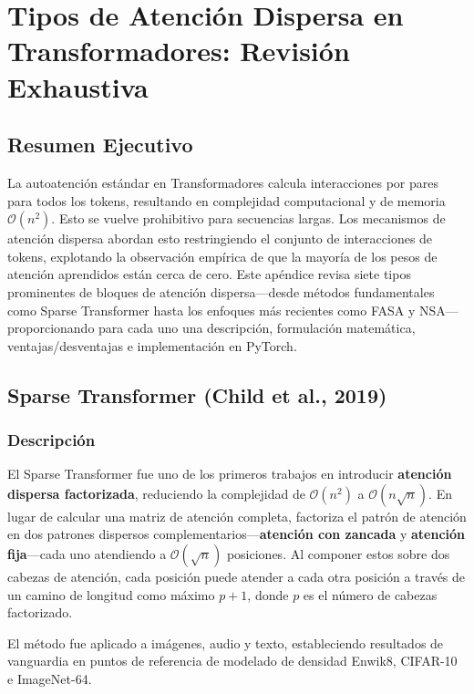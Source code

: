 \documentclass[11pt,a4paper]{article}
\begin{document}
\appendix

\section{Tipos de Atención Dispersa en Transformadores: Revisión Exhaustiva}
\label{appendix:sparse_attention}

\subsection{Resumen Ejecutivo}

La autoatención estándar en Transformadores calcula interacciones por pares para todos los tokens, resultando en complejidad computacional y de memoria $\mathcal{O}(n^2)$. Esto se vuelve prohibitivo para secuencias largas. Los mecanismos de atención dispersa abordan esto restringiendo el conjunto de interacciones de tokens, explotando la observación empírica de que la mayoría de los pesos de atención aprendidos están cerca de cero. Este apéndice revisa siete tipos prominentes de bloques de atención dispersa—desde métodos fundamentales como Sparse Transformer hasta los enfoques más recientes como FASA y NSA—proporcionando para cada uno una descripción, formulación matemática, ventajas/desventajas e implementación en PyTorch.

\subsection{Sparse Transformer (Child et al., 2019)}

\subsubsection{Descripción}

El Sparse Transformer fue uno de los primeros trabajos en introducir \textbf{atención dispersa factorizada}, reduciendo la complejidad de $\mathcal{O}(n^2)$ a $\mathcal{O}(n\sqrt{n})$. En lugar de calcular una matriz de atención completa, factoriza el patrón de atención en dos patrones dispersos complementarios—\textbf{atención con zancada} y \textbf{atención fija}—cada uno atendiendo a $\mathcal{O}(\sqrt{n})$ posiciones. Al componer estos sobre dos cabezas de atención, cada posición puede atender a cada otra posición a través de un camino de longitud como máximo $p+1$, donde $p$ es el número de cabezas factorizado.

El método fue aplicado a imágenes, audio y texto, estableciendo resultados de vanguardia en puntos de referencia de modelado de densidad Enwik8, CIFAR-10 e ImageNet-64.
\end{document}
